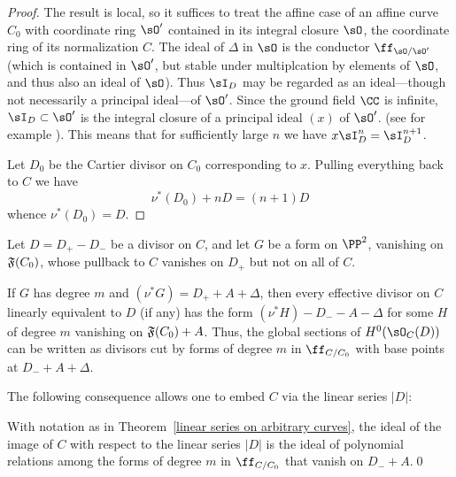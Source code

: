 \begin{proof}
The result is local, so it suffices to treat the affine case of an affine curve $C_{0}$ with coordinate
ring $\sO'$ contained
in its integral closure $\sO$, the coordinate ring of its normalization $C$.
The ideal of $\Delta$ in $\sO$ is the conductor $\ff_{\sO/{\sO'}}$ (which is contained in $\sO'$, but stable under
multiplcation by elements of $\sO$, and thus also an ideal of $\sO$). 
Thus $\sI_{D}$ may be regarded as an ideal---though not necessarily a principal ideal---of $\sO'$. Since the  ground field $\CC$ is infinite, $\sI_{D}\subset \sO'$ is the integral closure of a principal ideal $(x)$
of $\sO'$.
(see for example \cite[Chapter 8]{Swanson-Huneke}).
This means that for sufficiently large $n$ we have $x\sI_{D}^{n} = \sI_{D}^{n+1}$.

Let $D_{0}$ be the Cartier divisor on $C_{0}$ corresponding to $x$. Pulling everything back to $C$
we have 
$$
\nu^*(D_{0})+nD = (n+1)D
$$
whence $\nu^*(D_{0}) = D$.
 \end{proof}


\begin{theorem}\label{linear series on arbitrary curves}
Let $D = D_{+}-D_{-}$ be a divisor on $C$, and let $G$ be a form on $\PP^{2}$,
vanishing on $\adj(C_{0})$, whose pullback to $C$
vanishes on $D_{+}$ but not on all of $C$. 

If $G$ has degree $m$ and $(\nu^{*}G) = D_{+}+A+\Delta$, then every effective divisor on
$C$ linearly equivalent to $D$ (if any) has the form $(\nu^*H)-D_{-}-A-\Delta$ for some $H$ of degree $m$
 vanishing on $\adj(C_{0})+A$. Thus, the global sections of $H^{0}(\sO_{C}(D))$ can be written
as divisors cut by forms of degree $m$ in $\ff_{C/C_{0}}$ with base points at $D_{-}+A+\Delta$.
\end{theorem}

The following consequence allows one to embed $C$ via the linear series $|D|$:

\begin{corollary}
With notation as in Theorem~\ref{linear series on arbitrary curves}, the ideal of the image of
$C$ with respect to the linear series $|D|$ is the ideal of polynomial relations among the forms
of degree $m$ in $\ff_{C/C_{0}}$ that vanish on $D_{-}+A$.\qed
\end{corollary}

